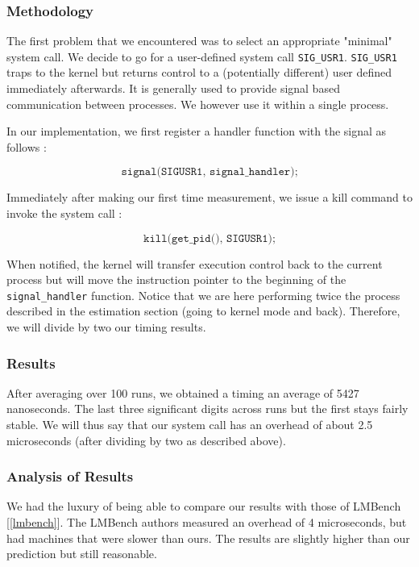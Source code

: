 \subsubsection{Methodology}

The first problem that we encountered was to select an appropriate "minimal" system call. We decide to
go for a user-defined system call \texttt{SIG\_USR1}. \texttt{SIG\_USR1} traps to the kernel but returns control
to a (potentially different) user defined immediately afterwards. It is generally used to provide signal based
communication between processes. We however use it within a single process.

In our implementation, we first register a handler function with the signal as follows :

$$ \texttt{signal(SIGUSR1, signal\_handler);}$$

Immediately after making our first time measurement, we issue a kill command to
invoke the system call :

$$ \texttt{kill(get\_pid(), SIGUSR1);}$$

When notified, the kernel will transfer execution control back to the current process
but will move the instruction pointer to the beginning of the \texttt{signal\_handler} function.
Notice that we are here performing twice the process described in the estimation section
(going to kernel mode and back). Therefore, we will divide by two our timing results.

\subsubsection{Results}

After averaging over 100 runs, we obtained a timing an average of 5427 nanoseconds.
The last three significant digits across runs but the first stays fairly stable. We will thus
say that our system call has an overhead of about 2.5 microseconds (after dividing by 
two as described above). 

\subsubsection{Analysis of Results}

We had the luxury of being able to compare our results with those of LMBench [\ref{lmbench}].
The LMBench authors measured an overhead of 4 microseconds, but had machines that
were slower than ours. The results are slightly higher than our prediction but still reasonable.

